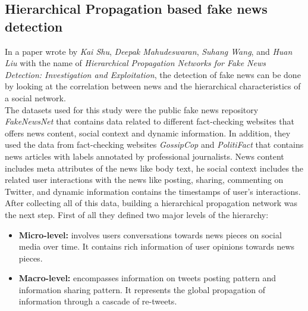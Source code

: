 \documentclass[conference]{IEEEtran}
\begin{document}
\begin{appendices}
\subsection{Hierarchical Propagation based fake news detection \cite{shu2020hierarchical} \cite{castillo2011information}}
In a paper wrote by \textit{Kai Shu}, \textit{Deepak Mahudeswaran}, \textit{Suhang Wang}, and \textit{Huan Liu} with the name of \textit{Hierarchical Propagation Networks for Fake News Detection: Investigation and Exploitation}, the detection of fake news can be done by looking at the correlation between news and the hierarchical characteristics of a social network.\\

The datasets used for this study were the public fake news repository \textit{FakeNewsNet} \cite{shu2018fakenewsnet} that contains data related to different fact-checking websites that offers news content, social context and dynamic information. In addition, they used the data from fact-checking websites \textit{GossipCop} and \textit{PolitiFact} that contains news articles with labels annotated by professional journalists. News content includes meta attributes of the news like body text, he social context includes the related user interactions with the news like posting, sharing, commenting on Twitter, and dynamic information contains the timestamps of user's interactions.\\

After collecting all of this data, building a hierarchical propagation network was the next step. First of all they defined two major levels of the hierarchy: 

\begin{itemize}
\item \textbf{Micro-level:} involves users conversations towards news pieces on social media over time. It contains rich information of user opinions towards news pieces.
\item \textbf{Macro-level:} encompasses information on tweets posting pattern and information sharing pattern. It represents the global propagation of information through a cascade of re-tweets.
\end{itemize}


\end{appendices}
\end{document}
